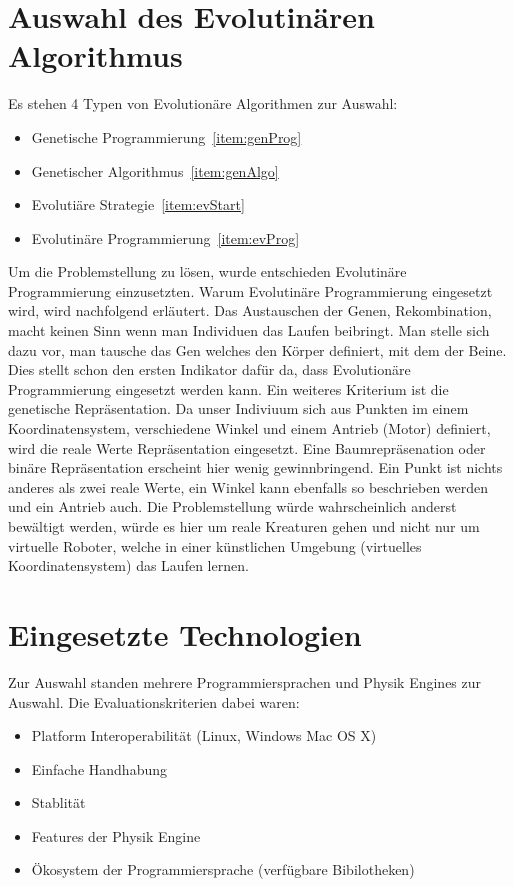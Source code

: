   \section{Auswahl des Evolutinären Algorithmus}
    Es stehen 4 Typen von Evolutionäre Algorithmen zur Auswahl:
    \begin{itemize}
      \item Genetische Programmierung~\ref{item:genProg}
      \item Genetischer Algorithmus~\ref{item:genAlgo}
      \item Evolutiäre Strategie~\ref{item:evStart}
      \item Evolutinäre Programmierung~\ref{item:evProg}
    \end{itemize}
    Um die Problemstellung zu lösen, wurde entschieden Evolutinäre Programmierung einzusetzten.
    Warum Evolutinäre Programmierung eingesetzt wird, wird nachfolgend erläutert.
    Das Austauschen der Genen, Rekombination, macht keinen Sinn wenn man Individuen das Laufen beibringt.
    Man stelle sich dazu vor, man tausche das Gen welches den Körper definiert, mit dem der Beine.
    Dies stellt schon den ersten Indikator dafür da,
    dass Evolutionäre Programmierung eingesetzt werden kann. Ein weiteres Kriterium ist die genetische Repräsentation.
    Da unser Indiviuum sich aus Punkten im einem Koordinatensystem,
    verschiedene Winkel und einem Antrieb (Motor) definiert, wird die reale Werte Repräsentation eingesetzt.
    Eine Baumrepräsenation oder binäre Repräsentation erscheint hier wenig gewinnbringend.
    Ein Punkt ist nichts anderes als zwei reale Werte,
    ein Winkel kann ebenfalls so beschrieben werden und ein Antrieb auch.
    Die Problemstellung würde wahrscheinlich anderst bewältigt werden,
    würde es hier um reale Kreaturen gehen und nicht nur um virtuelle Roboter,
    welche in einer künstlichen Umgebung (virtuelles Koordinatensystem) das Laufen lernen.

  \section{Eingesetzte Technologien}

    Zur Auswahl standen mehrere Programmiersprachen und Physik Engines zur Auswahl. Die Evaluationskriterien dabei waren:
    \begin{itemize}
      \item Platform Interoperabilität (Linux, Windows Mac OS X)
      \item Einfache Handhabung
      \item Stablität
      \item Features der Physik Engine
      \item Ökosystem der Programmiersprache (verfügbare Bibilotheken)
    \end{itemize}

